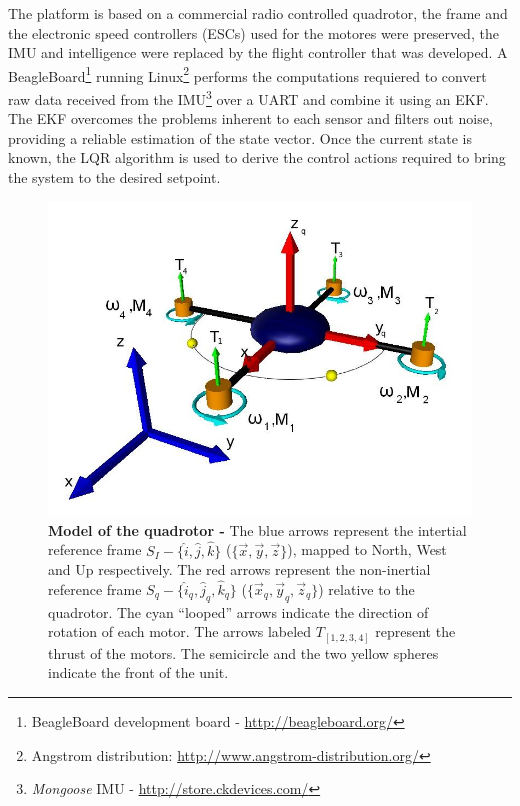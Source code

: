 \documentclass[conference]{IEEEtran}
\begin{document}
The platform is based on a commercial radio controlled quadrotor, the frame and the electronic speed controllers (ESCs) used for the motores were preserved, the IMU and intelligence were replaced by the flight controller that was developed. A BeagleBoard\footnote{BeagleBoard development board - \url{http://beagleboard.org/}} running Linux\footnote{Angstrom distribution: \url{http://www.angstrom-distribution.org/}} performs the computations requiered to convert raw data received from the IMU\footnote{\textit{Mongoose} IMU - \url{http://store.ckdevices.com/}} over a UART and combine it using an EKF. The EKF overcomes the problems inherent to each sensor and filters out noise, providing a reliable estimation of the state vector. Once the current state is known, the LQR algorithm\cite{bib:lqrnotes}\cite{bib:lqr-discreto} is used to derive the control actions required to bring the system to the desired setpoint.

\begin{figure}
	\centering
	\includegraphics[width=.7\columnwidth]{./pics_paper/quad_coord.jpg}
	\caption{\textbf{Model of the quadrotor -} The blue arrows represent the intertial reference frame $S_I - \lbrace \hat{i},\hat{j},\hat{k}\rbrace$ ($\lbrace \vec{x},\vec{y},\vec{z}\rbrace$), mapped to  North, West and Up respectively. The red arrows represent the non-inertial reference frame $S_q - \lbrace \hat{i}_q,\hat{j}_q,\hat{k}_q\rbrace$ ($\lbrace \vec{x}_q,\vec{y}_q,\vec{z}_q\rbrace$) relative to the quadrotor. The cyan ``looped'' arrows indicate the direction of rotation of each motor. The arrows labeled $T_{[1,2,3,4]}$ represent the thrust of the motors. The semicircle and the two yellow spheres indicate the front of the unit.}
	\label{fig:quad}
\end{figure}


\end{document}
